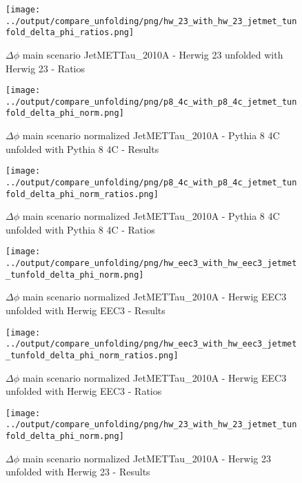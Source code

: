 \documentclass[11pt]{book}
\begin{document}
\begin{figure}[ht]
\centering
\texttt{[image: ../output/compare\_unfolding/png/hw\_23\_with\_hw\_23\_jetmet\_tunfold\_delta\_phi\_ratios.png]}
\caption{$\Delta\phi$ main scenario JetMETTau\_2010A - Herwig 23 unfolded with Herwig 23 - Ratios}
\label{hw_23_jetmet_tunfold_delta_phi_b}
\end{figure}


\begin{figure}[ht]
\centering
\texttt{[image: ../output/compare\_unfolding/png/p8\_4c\_with\_p8\_4c\_jetmet\_tunfold\_delta\_phi\_norm.png]}
\caption{$\Delta\phi$ main scenario normalized JetMETTau\_2010A - Pythia 8 4C unfolded with Pythia 8 4C - Results}
\label{p8_p8_jetmet_tunfold_delta_phi_norm_a}
\end{figure}

\begin{figure}[ht]
\centering
\texttt{[image: ../output/compare\_unfolding/png/p8\_4c\_with\_p8\_4c\_jetmet\_tunfold\_delta\_phi\_norm\_ratios.png]}
\caption{$\Delta\phi$ main scenario normalized JetMETTau\_2010A - Pythia 8 4C unfolded with Pythia 8 4C - Ratios}
\label{p8_p8_jetmet_tunfold_delta_phi_norm_b}
\end{figure}

\begin{figure}[ht]
\centering
\texttt{[image: ../output/compare\_unfolding/png/hw\_eec3\_with\_hw\_eec3\_jetmet\_tunfold\_delta\_phi\_norm.png]}
\caption{$\Delta\phi$ main scenario normalized JetMETTau\_2010A - Herwig EEC3 unfolded with Herwig EEC3 - Results}
\label{hw_eec3_hw_eec3_jetmet_tunfold_delta_phi_norm_a}
\end{figure}

\begin{figure}[ht]
\centering
\texttt{[image: ../output/compare\_unfolding/png/hw\_eec3\_with\_hw\_eec3\_jetmet\_tunfold\_delta\_phi\_norm\_ratios.png]}
\caption{$\Delta\phi$ main scenario normalized JetMETTau\_2010A - Herwig EEC3 unfolded with Herwig EEC3 - Ratios}
\label{hw_eec3_jetmet_tunfold_delta_phi_norm_b}
\end{figure}

\begin{figure}[ht]
\centering
\texttt{[image: ../output/compare\_unfolding/png/hw\_23\_with\_hw\_23\_jetmet\_tunfold\_delta\_phi\_norm.png]}
\caption{$\Delta\phi$ main scenario normalized JetMETTau\_2010A - Herwig 23 unfolded with Herwig 23 - Results}
\label{hw_23_hw_23_jetmet_tunfold_delta_phi_norm_a}
\end{figure}
\end{document}
